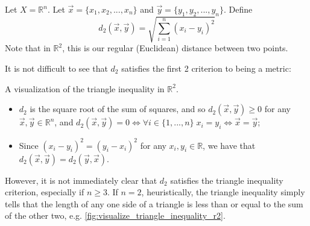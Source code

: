 \documentclass[notoc,notitlepage]{tufte-book}
\begin{document}
\begin{eg}\label{eg:euclidean_metric}
  Let $X = \mathbb{R}^n$. Let $\vec{x} = \{ x_1, x_2, ..., x_n \}$ and $\vec{y} = \{ y_1, y_2, ..., y_n \}$. Define
  \begin{equation*}
    d_2(\vec{x}, \vec{y}) = \sqrt{ \sum_{i=1}^{n} ( x_i - y_i )^2 }
  \end{equation*}
  Note that in $\mathbb{R}^2$, this is our regular (Euclidean) distance between two points.

  It is not difficult to see that $d_2$ satisfies the first 2 criterion to being a metric:
  \begin{marginfigure}
    \caption{A visualization of the triangle inequality in $\mathbb{R}^2$.}
    \label{fig:visualize_triangle_inequality_r2}
  \end{marginfigure}
  \begin{itemize}
    \item $d_2$ is the square root of the sum of squares, and so $d_2(\vec{x}, \vec{y}) \geq 0$ for any $\vec{x}, \vec{y} \in \mathbb{R}^n$, and $d_2(\vec{x}, \vec{y}) = 0 \iff \forall i \in \{1, ..., n\} \; x_i = y_i \iff \vec{x} = \vec{y}$;
      \item Since $(x_i - y_i)^2 = (y_i - x_i)^2$ for any $x_i, y_i \in \mathbb{R}$, we have that $d_2(\vec{x}, \vec{y}) = d_2(\vec{y}, \vec{x})$.
  \end{itemize}
  However, it is not immediately clear that $d_2$ satisfies the triangle inequality criterion, especially if $n \geq 3$. If $n = 2$, heuristically, the triangle inequality simply tells that the length of any one side of a triangle is less than or equal to the sum of the other two, e.g. \cref{fig:visualize_triangle_inequality_r2}.
\end{eg}
\end{document}
